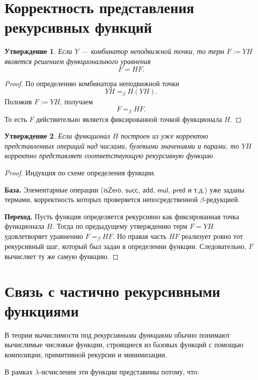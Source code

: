 \documentclass[12pt,a4paper]{article}
\newtheorem{proposition}{Утверждение}
\theoremstyle{remark}
\begin{document}
\section{Корректность представления рекурсивных функций}

\begin{proposition}
Если $Y$ --- комбинатор неподвижной точки, то терм $F:=YH$ является решением функционального уравнения
\[
F=HF.
\]
\end{proposition}

\begin{proof}
По определению комбинатора неподвижной точки
\[
YH =_\beta H(YH).
\]
Положив $F:=YH$, получаем
\[
F =_\beta HF.
\]
То есть $F$ действительно является фиксированной точкой функционала $H$.
\end{proof}

\begin{proposition}
Если функционал $H$ построен из уже корректно представленных операций над числами, булевыми значениями и парами, то $YH$ корректно представляет соответствующую рекурсивную функцию.
\end{proposition}

\begin{proof}
Индукция по схеме определения функции.

\textbf{База.}
Элементарные операции ($\mathsf{isZero}$, $\mathsf{succ}$, $\mathsf{add}$, $\mathsf{mul}$, $\mathsf{pred}$ и т.д.) уже заданы термами, корректность которых проверяется непосредственной $\beta$-редукцией.

\textbf{Переход.}
Пусть функция определяется рекурсивно как фиксированная точка функционала $H$. Тогда по предыдущему утверждению терм $F=YH$ удовлетворяет уравнению $F=_\beta HF$. Но правая часть $HF$ реализует ровно тот рекурсивный шаг, который был задан в определении функции. Следовательно, $F$ вычисляет ту же самую функцию.
\end{proof}

\section{Связь с частично рекурсивными функциями}

В теории вычислимости под \emph{рекурсивными функциями} обычно понимают вычислимые числовые функции, строящиеся из базовых функций с помощью композиции, примитивной рекурсии и минимизации.

В рамках $\lambda$-исчисления эти функции представимы потому, что:
\end{document}
